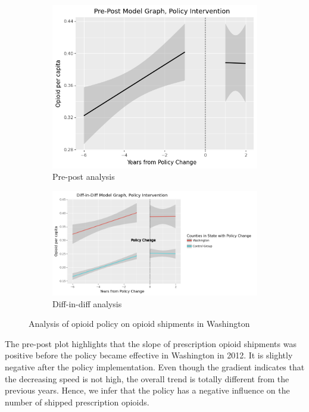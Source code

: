 \documentclass[12pt,letterpaper]{article}
\begin{document}
\begin{figure}[!h]
\centering
\begin{subfigure}{.5\textwidth}
  \centering
  \includegraphics[width=0.7\linewidth]{../30_results/General_Results/washington_opioid_shipment_prepost.png}
  \caption{Pre-post analysis}
  \label{fig:wa_ship_prepost}
\end{subfigure}%
\begin{subfigure}{.55\textwidth}
  \centering
  \includegraphics[width=1\linewidth]{../30_results/General_Results/washington_opioid_shipment_diffdiff.png}
  \caption{Diff-in-diff analysis}
  \label{fig:wa_ship_did}
\end{subfigure}
\caption{Analysis of opioid policy on opioid shipments in Washington}
\label{fig:wa_ship}
\end{figure}

The pre-post plot highlights that the slope of prescription opioid shipments was positive before the policy became effective in Washington in 2012. It is slightly negative after the policy implementation. Even though the gradient indicates that the decreasing speed is not high, the overall trend is totally different from the previous years. Hence, we infer that the policy has a negative influence on the number of shipped prescription opioids.
\end{document}
